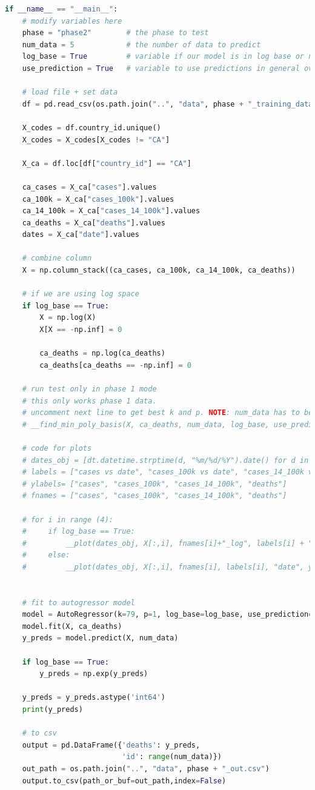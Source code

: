 \begin{lstlisting}[language=Python, caption=Main function]
if __name__ == "__main__":
    # modify variables here
    phase = "phase2"        # the phase to test
    num_data = 5            # the number of data to predict
    log_base = True         # variable if our model is in log base or not
    use_prediction = True   # variable to use predictions in general over time series

    # load file + set data
    df = pd.read_csv(os.path.join("..", "data", phase + "_training_data.csv"))
    
    X_codes = df.country_id.unique()
    X_codes = X_codes[X_codes != "CA"]

    X_ca = df.loc[df["country_id"] == "CA"]

    ca_cases = X_ca["cases"].values
    ca_100k = X_ca["cases_100k"].values
    ca_14_100k = X_ca["cases_14_100k"].values
    ca_deaths = X_ca["deaths"].values
    dates = X_ca["date"].values

    # combine column
    X = np.column_stack((ca_cases, ca_100k, ca_14_100k, ca_deaths))

    # if we are using log space
    if log_base == True:
        X = np.log(X)
        X[X == -np.inf] = 0

        ca_deaths = np.log(ca_deaths)
        ca_deaths[ca_deaths == -np.inf] = 0

    # run test only in phase 1 mode
    # this only works phase 1 data.
    # uncomment next line to get best k and p. NOTE: num_data has to be either 11 or 20
    # __find_min_poly_basis(X, ca_deaths, num_data, log_base, use_prediction)
    
    # code for plots
    # dates_obj = [dt.datetime.strptime(d, "%m/%d/%Y").date() for d in dates]
    # labels = ["cases vs date", "cases_100k vs date", "cases_14_100k vs date", "deaths vs date"]
    # ylabels= ["cases", "cases_100k", "cases_14_100k", "deaths"]
    # fnames = ["cases", "cases_100k", "cases_14_100k", "deaths"]

    # for i in range (4):
    #     if log_base == True:
    #         __plot(dates_obj, X[:,i], fnames[i]+"_log", labels[i] + " (log)", "date", ylabels[i] + " (log)")
    #     else:
    #         __plot(dates_obj, X[:,i], fnames[i], labels[i], "date", ylabels[i])
        

    # fit to autogressor model
    model = AutoRegressor(k=79, p=1, log_base=log_base, use_prediction=use_prediction)
    model.fit(X, ca_deaths)
    y_preds = model.predict(X, num_data)

    if log_base == True:
        y_preds = np.exp(y_preds)

    y_preds = y_preds.astype('int64')
    print(y_preds)
    
    # to csv
    output = pd.DataFrame({'deaths': y_preds,
                           'id': range(num_data)})
    out_path = os.path.join("..", "data", phase + "_out.csv")
    output.to_csv(path_or_buf=out_path,index=False)
\end{lstlisting}
